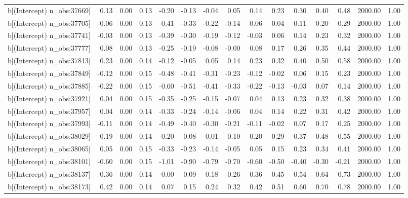 \begin{table}[ht]
\begin{tabular}{rrrrrrrrrrrrrrr}
  b[(Intercept) n\_obs:37669] & 0.13 & 0.00 & 0.13 & -0.20 & -0.13 & -0.04 & 0.05 & 0.14 & 0.23 & 0.30 & 0.40 & 0.48 & 2000.00 & 1.00 \\ 
  b[(Intercept) n\_obs:37705] & -0.06 & 0.00 & 0.13 & -0.41 & -0.33 & -0.22 & -0.14 & -0.06 & 0.04 & 0.11 & 0.20 & 0.29 & 2000.00 & 1.00 \\ 
  b[(Intercept) n\_obs:37741] & -0.03 & 0.00 & 0.13 & -0.39 & -0.30 & -0.19 & -0.12 & -0.03 & 0.06 & 0.14 & 0.23 & 0.32 & 2000.00 & 1.00 \\ 
  b[(Intercept) n\_obs:37777] & 0.08 & 0.00 & 0.13 & -0.25 & -0.19 & -0.08 & -0.00 & 0.08 & 0.17 & 0.26 & 0.35 & 0.44 & 2000.00 & 1.00 \\ 
  b[(Intercept) n\_obs:37813] & 0.23 & 0.00 & 0.14 & -0.12 & -0.05 & 0.05 & 0.14 & 0.23 & 0.32 & 0.40 & 0.50 & 0.58 & 2000.00 & 1.00 \\ 
  b[(Intercept) n\_obs:37849] & -0.12 & 0.00 & 0.15 & -0.48 & -0.41 & -0.31 & -0.23 & -0.12 & -0.02 & 0.06 & 0.15 & 0.23 & 2000.00 & 1.00 \\ 
  b[(Intercept) n\_obs:37885] & -0.22 & 0.00 & 0.15 & -0.60 & -0.51 & -0.41 & -0.33 & -0.22 & -0.13 & -0.03 & 0.07 & 0.14 & 2000.00 & 1.00 \\ 
  b[(Intercept) n\_obs:37921] & 0.04 & 0.00 & 0.15 & -0.35 & -0.25 & -0.15 & -0.07 & 0.04 & 0.13 & 0.23 & 0.32 & 0.38 & 2000.00 & 1.00 \\ 
  b[(Intercept) n\_obs:37957] & 0.04 & 0.00 & 0.14 & -0.33 & -0.24 & -0.14 & -0.06 & 0.04 & 0.14 & 0.22 & 0.31 & 0.42 & 2000.00 & 1.00 \\ 
  b[(Intercept) n\_obs:37993] & -0.11 & 0.00 & 0.14 & -0.49 & -0.40 & -0.30 & -0.21 & -0.11 & -0.02 & 0.07 & 0.17 & 0.25 & 2000.00 & 1.00 \\ 
  b[(Intercept) n\_obs:38029] & 0.19 & 0.00 & 0.14 & -0.20 & -0.08 & 0.01 & 0.10 & 0.20 & 0.29 & 0.37 & 0.48 & 0.55 & 2000.00 & 1.00 \\ 
  b[(Intercept) n\_obs:38065] & 0.05 & 0.00 & 0.15 & -0.33 & -0.23 & -0.14 & -0.05 & 0.05 & 0.15 & 0.23 & 0.34 & 0.41 & 2000.00 & 1.00 \\ 
  b[(Intercept) n\_obs:38101] & -0.60 & 0.00 & 0.15 & -1.01 & -0.90 & -0.79 & -0.70 & -0.60 & -0.50 & -0.40 & -0.30 & -0.21 & 2000.00 & 1.00 \\ 
  b[(Intercept) n\_obs:38137] & 0.36 & 0.00 & 0.14 & -0.00 & 0.09 & 0.18 & 0.26 & 0.36 & 0.45 & 0.54 & 0.64 & 0.73 & 2000.00 & 1.00 \\ 
  b[(Intercept) n\_obs:38173] & 0.42 & 0.00 & 0.14 & 0.07 & 0.15 & 0.24 & 0.32 & 0.42 & 0.51 & 0.60 & 0.70 & 0.78 & 2000.00 & 1.00 \\ 

\end{tabular}
\end{table}
